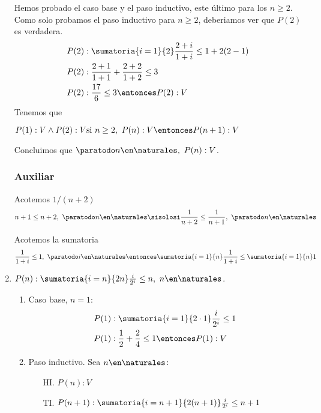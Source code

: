 \begin{enumerate}[label=\roman*)]
        Hemos probado el caso base y el paso inductivo, este último para los $n \geq 2$. Como solo probamos el paso
        inductivo para $n \geq 2$, deberiamos ver que $P(2)$ es verdadera.
        \begin{align*}
          P(2) & : \sumatoria{i=1}{2} \frac{2+i}{1+i} \leq 1 + 2(2-1) \\
          P(2) & : \frac{2+1}{1+1} + \frac{2+2}{1+2} \leq 3           \\
          P(2) & : \frac{17}{6} \leq 3 \entonces P(2): V
        \end{align*}
        Tenemos que

        $P(1): V \land P(2): V \\
          \text{si } n \geq 2, \ P(n): V \entonces P(n+1): V$

        Concluimos que $\paratodo n \en \naturales, \ P(n): V$.

        \subsubsection*{Auxiliar}
        Acotemos $1/(n+2)$
        \begin{align*}
          n+1 \leq n + 2 , \ \paratodo n \en \naturales \sisolosi \frac{1}{n+2} \leq \frac{1}{n+1},
          \ \paratodo n \en \naturales
        \end{align*}

        Acotemos la sumatoria
        \begin{align*}
          \frac{1}{1+i} \leq 1, \ \paratodo i \en \naturales \entonces \sumatoria{i=1}{n} \frac{1}{1+i} \leq \sumatoria{i=1}{n} 1
        \end{align*}

  \item $P(n):  \sumatoria{i=n}{2n} \frac{i}{2^i} \leq n, \ n \en \naturales$.
        \begin{enumerate}[label=\arabic*)]
          \item Caso base, $n = 1$:
                \begin{align*}
                  P(1) & : \sumatoria{i=1}{2 \cdot 1} \frac{i}{2^i} \leq 1    \\
                  P(1) & : \frac{1}{2} + \frac{2}{4} \leq 1 \entonces P(1): V
                \end{align*}
          \item Paso inductivo. Sea $n \en \naturales$:
                \begin{enumerate}
                  \item[HI.] $P(n): V$
                  \item[TI.] $P(n+1):  \sumatoria{i=n+1}{2(n+1)} \frac{i}{2^i} \leq n+1$
                \end{enumerate}


\end{enumerate}
\end{enumerate}
